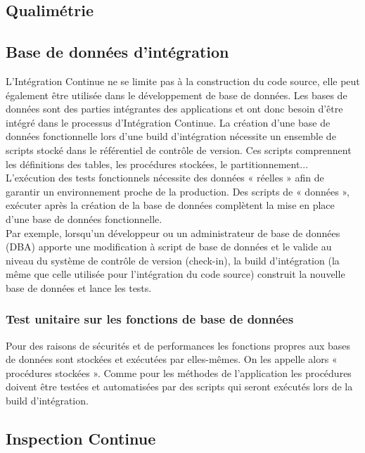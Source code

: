 \documentclass{report}
\begin{document}
      \subsection{Qualimétrie}

      \subsection{Base de données d’intégration}
      L’Intégration Continue ne se limite pas à la construction du code source, elle peut également être utilisée dans le développement de base de données. Les bases de données sont des parties intégrantes des applications et ont donc besoin d’être intégré dans le processus d’Intégration Continue. La création d’une base de données fonctionnelle lors d’une build d’intégration nécessite un ensemble de scripts stocké dans le référentiel de contrôle de version. Ces scripts comprennent les définitions des tables, les procédures stockées, le partitionnement... L’exécution des tests fonctionnels nécessite des données « réelles » afin de garantir un environnement proche de la production. Des scripts de « données », exécuter après la création de la base de données complètent la mise en place d’une base de données fonctionnelle.\\

      Par exemple, lorsqu’un développeur ou un administrateur de base de données (DBA) apporte une modification à script de base de données et le valide au niveau du système de contrôle de version (check-in), la build d’intégration (la même que celle utilisée pour l’intégration du code source) construit la nouvelle base de données et lance les tests.

      \subsubsection{Test unitaire sur les fonctions de base de données}
      Pour des raisons de sécurités et de performances les fonctions propres aux bases de données sont stockées et exécutées par elles-mêmes. On les appelle alors « procédures stockées ». Comme pour les méthodes de l’application les procédures doivent être testées et automatisées par des scripts qui seront exécutés lors de la build d’intégration.

      \subsection{Inspection Continue}
\end{document}
